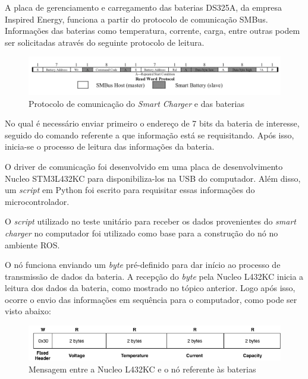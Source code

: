 	    A placa de gerenciamento e carregamento das baterias DS325A, da empresa Inspired Energy, funciona a partir do protocolo de comunicação SMBus. Informações das baterias como temperatura, corrente, carga, entre outras podem ser solicitadas através do seguinte protocolo de leitura.
	    
	    \begin{figure}[!ht]
			   \centering
			   \includegraphics[width=16cm]{Figures/batt_protocol.png}
			   \caption{Protocolo de comunicação do \textit{Smart Charger} e das baterias}
			   \label{fig:batt_protocol}
		\end{figure}   
		
		No qual é necessário enviar primeiro o endereço de 7 bits da bateria de interesse, seguido do comando referente a que informação está se requisitando. Após isso, inicia-se o processo de leitura das informações da bateria.
		
		O driver de comunicação foi desenvolvido em uma placa de desenvolvimento Nucleo STM3L432KC para disponibiliza-los na USB do computador. Além disso, um \textit{script} em Python foi escrito para requisitar essas informações do microcontrolador.
		
		  O \textit{script} utilizado no teste unitário para receber os dados provenientes do \textit{smart charger} no computador foi utilizado como base para a construção do nó no ambiente ROS.
     
     O nó funciona enviando um \textit{byte} pré-definido para dar início ao processo de transmissão de dados da bateria. A recepção do \textit{byte} pela Nucleo L432KC inicia a leitura dos dados da bateria, como mostrado no tópico anterior. Logo após isso, ocorre o envio das informações em sequência para o computador, como pode ser visto abaixo:
      
      \begin{figure}[!ht]
		   \centering
		   \includegraphics[width=16cm]{Figures/batt_protocol_2.png}
		   \caption{Mensagem entre a Nucleo L432KC e o nó referente às baterias}
		   \label{fig:battprotocol2}
		\end{figure}
		      
